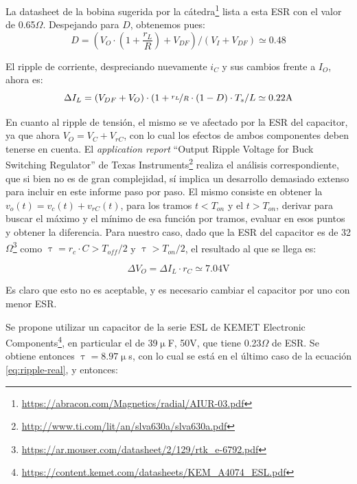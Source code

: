\documentclass[e4_tp1_main.tex]{subfiles}
\begin{document}
La datasheet de la bobina sugerida por la 
c\'atedra\footnote{
	\url{https://abracon.com/Magnetics/radial/AIUR-03.pdf}
} lista a esta ESR con el valor de 0.65$\Omega$.
Despejando para $D$, obtenemos pues:
\begin{equation}
	D = \left(V_O \cdot \left( 1+ \frac{r_L}{R}\right)+ V_{DF}\right)/(V_I + V_{DF}) 
\simeq 0.48 
\end{equation}


El ripple de corriente, despreciando nuevamente $i_C$ y sus cambios frente a $I_O$, ahora es:
\begin{equation}
	\Delta I_L = (V_{DF} + V_O) \cdot (1+\nicefrac{r_L}{R} \cdot (1-D) \cdot T_s / L\simeq 0.22\text{A} 
\end{equation}

En cuanto al ripple de tensi\'on, el mismo se ve afectado por la ESR del capacitor, ya que ahora $V_O = V_C + V_{rC}$, con lo cual los efectos de ambos componentes deben tenerse en cuenta. El \textit{application report} ``Output Ripple Voltage for Buck Switching Regulator'' de Texas Instruments\footnote{ 
	\url{http://www.ti.com/lit/an/slva630a/slva630a.pdf}
} realiza el an\'alisis correspondiente, que si bien no es de gran complejidad, s\'i implica un desarrollo demasiado extenso para incluir en este informe paso por paso. El mismo consiste en obtener la $v_o(t) = v_c(t) + v_{rC}(t)$, para los tramos $t<T_{on}$ y el $t>T_{on}$, derivar para buscar el m\'aximo y el m\'inimo de esa funci\'on por tramos, evaluar en esos puntos y obtener la diferencia. Para nuestro caso, dado que la ESR del capacitor es de 32$\Omega$\footnote{ 
\url{https://ar.mouser.com/datasheet/2/129/rtk_e-6792.pdf}
} como $\uptau = r_c \cdot C > T_{off}/2$ y $\uptau > T_{on}/2$, el resultado al que se llega es: 

\begin{equation}
	\Delta V_O =	\Delta I_L \cdot r_C \simeq 7.04\text{V}
	\label{eq:ripple-real}
\end{equation}

Es claro que esto no es aceptable, y es necesario cambiar el capacitor por uno con menor ESR.

Se propone utilizar un capacitor de la serie ESL de KEMET Electronic Components\footnote{
	\url{https://content.kemet.com/datasheets/KEM_A4074_ESL.pdf}
}, en particular el de 39$\upmu$F, 50V, que tiene 0.23$\Omega$ de ESR. Se obtiene entonces $\uptau = 8.97 \upmu$s, con lo cual se est\'a en el \'ultimo caso de la ecuaci\'on \ref{eq:ripple-real}, y entonces:
\end{document}

